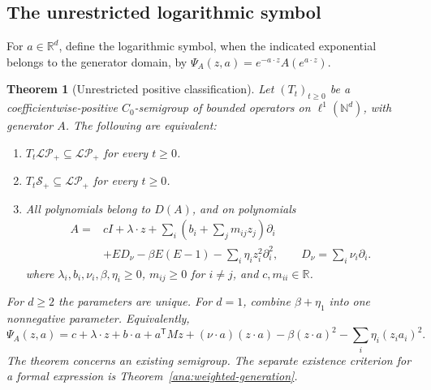 \documentclass[reqno]{amsart}
\newtheorem{theorem}{Theorem}[section]
\theoremstyle{definition}
\theoremstyle{remark}
\newcommand{\R}{\mathbb R}
\newcommand{\N}{\mathbb N}
\begin{document}
\subsection{The unrestricted logarithmic symbol}

For \(a\in\R^d\), define the logarithmic symbol, when the indicated exponential
belongs to the generator domain, by
\(\Psi_A(z,a)=e^{-a\cdot z}A(e^{a\cdot z})\).

\begin{theorem}[Unrestricted positive classification]\label{pos:symbol}
Let \((T_t)_{t\ge0}\) be a coefficientwise-positive \(C_0\)-semigroup of bounded
operators on \(\ell^1(\N^d)\), with generator \(A\).  The following are equivalent:
\begin{enumerate}
\item \(T_t\mathcal{LP}_+\subseteq\mathcal{LP}_+\) for every \(t\ge0\).
\item \(T_t\mathcal S_+\subseteq\mathcal{LP}_+\) for every \(t\ge0\).
\item All polynomials belong to \(D(A)\), and on polynomials
\begin{equation}\label{pos:canonical}
 \begin{aligned}
 A={}&cI+\lambda\cdot z+
 \sum_i\left(b_i+\sum_jm_{ij}z_j\right)\partial_i
 \\
 &+ED_\nu-\beta E(E-1)-\sum_i\eta_i z_i^2\partial_i^2,
 \qquad D_\nu=\sum_i\nu_i\partial_i .
 \end{aligned}
\end{equation}
where \(\lambda_i,b_i,\nu_i,\beta,\eta_i\ge0\), \(m_{ij}\ge0\) for \(i\ne j\),
and \(c,m_{ii}\in\R\).
\end{enumerate}
For \(d\ge2\) the parameters are unique.  For \(d=1\), combine \(\beta+\eta_1\)
into one nonnegative parameter.  Equivalently,
\begin{equation}\label{pos:log-symbol}
 \Psi_A(z,a)=c+\lambda\cdot z+b\cdot a+a^{\mathsf T}Mz
 +(\nu\cdot a)(z\cdot a)-\beta(z\cdot a)^2
 -\sum_i\eta_i(z_i a_i)^2.
\end{equation}
The theorem concerns an existing semigroup.  The separate existence criterion for
a formal expression is Theorem~\ref{ana:weighted-generation}.
\end{theorem}
\end{document}
